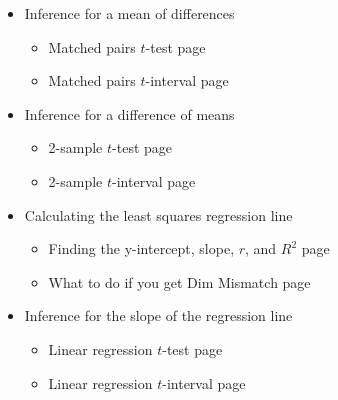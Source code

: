 \begin{itemize}
\item[] Inference for a mean of differences
\begin{itemize}\vspace{-1mm}
\setlength{\itemsep}{0mm}
\item[] Matched pairs $t$-test \hfill page~\pageref{matchedpairsttest}
\item[] Matched pairs $t$-interval  \hfill page~\pageref{matchedpairstint}
\end{itemize}


\item[] Inference for a difference of means 
\begin{itemize}\vspace{-1mm}
\setlength{\itemsep}{0mm}
\item[] 2-sample $t$-test  \hfill page~\pageref{2SampTtest}
\item[] 2-sample $t$-interval \hfill page~\pageref{2SampTint}
\end{itemize}


\item[] Calculating the least squares regression line
\begin{itemize}\vspace{-1mm}
\setlength{\itemsep}{0mm}
\item[] Finding the y-intercept, slope, $r$, and $R^2$ \hfill page~\pageref{calclinreg}
\item[] What to do if you get Dim Mismatch \hfill page~\pageref{dimmismatch}
\end{itemize}


\item[] Inference for the slope of the regression line
\begin{itemize}\vspace{-1mm}
\setlength{\itemsep}{0mm}
\item[] Linear regression $t$-test  \hfill page~\pageref{LinRegtest}
\item[] Linear regression $t$-interval \hfill page~\pageref{LinRegint}
\end{itemize}



\end{itemize}

